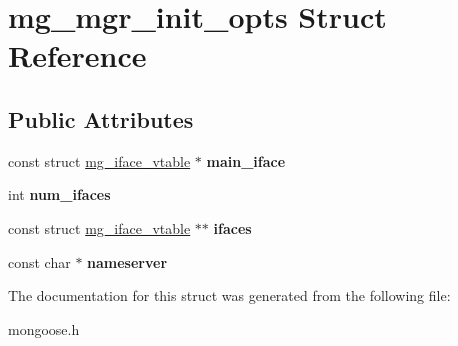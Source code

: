 \hypertarget{structmg__mgr__init__opts}{}\section{mg\+\_\+mgr\+\_\+init\+\_\+opts Struct Reference}
\label{structmg__mgr__init__opts}
\subsection*{Public Attributes}
\begin{DoxyCompactItemize}
\item 
\mbox{\label{structmg__mgr__init__opts_ac72a1f670b50b1ab79bc9e2790f114c3}} 
const struct \hyperlink{structmg__iface__vtable}{mg\+\_\+iface\+\_\+vtable} $\ast$ {\bfseries main\+\_\+iface}
\item 
\mbox{\label{structmg__mgr__init__opts_a9e6fe35e823019f31446d34e29cc3f4a}} 
int {\bfseries num\+\_\+ifaces}
\item 
\mbox{\label{structmg__mgr__init__opts_adf5a32b0abe41300d2109969b768f33d}} 
const struct \hyperlink{structmg__iface__vtable}{mg\+\_\+iface\+\_\+vtable} $\ast$$\ast$ {\bfseries ifaces}
\item 
\mbox{\label{structmg__mgr__init__opts_a1c54576a6dc65d0d1fba5caec53847fd}} 
const char $\ast$ {\bfseries nameserver}
\end{DoxyCompactItemize}


The documentation for this struct was generated from the following file\+:\begin{DoxyCompactItemize}
\item 
mongoose.\+h\end{DoxyCompactItemize}
